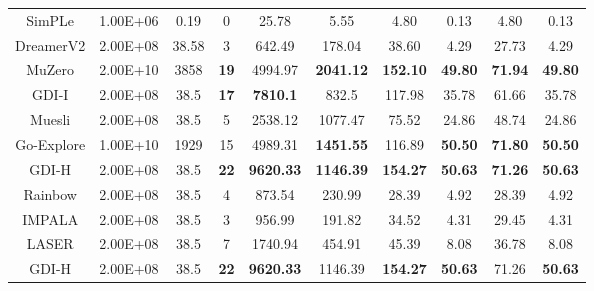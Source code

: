 \documentclass[nohyperref]{article}
\def\GDIHmeanhns{9620.33}
\def\GDIHmedianhns{1146.39}
\def\GDIHHWRB{22}
\def\GDIHmeanHWRNS{154.27}
\def\GDIHmedianHWRNS{50.63}
\def\GDIHmeanSABER{71.26}
\def\GDIHmedianSABER{50.63}
\def\GDIHnumframes{2.00E+08}
\def\GDIHgametime{38.5}
\def\GDIImeanhns{7810.1}
\def\GDIImedianhns{832.5}
\def\GDIIHWRB{17}
\def\GDIImeanHWRNS{117.98}
\def\GDIImedianHWRNS{35.78}
\def\GDIImeanSABER{61.66}
\def\GDIImedianSABER{35.78}
\def\GDIInumframes{2.00E+08}
\def\GDIIgametime{38.5}
\def\rainbowmeanhns{873.54}
\def\rainbowmedianhns{230.99}
\def\rainbowHWRB{4}
\def\rainbowmeanHWRNS{28.39}
\def\rainbowmedianHWRNS{4.92}
\def\rainbowmeanSABER{28.39}
\def\rainbowmedianSABER{4.92}
\def\rainbownumframes{2.00E+08}
\def\rainbowgametime{38.5}
\def\impalameanhns{956.99}
\def\impalamedianhns{191.82}
\def\impalaHWRB{3}
\def\impalameanHWRNS{34.52}
\def\impalamedianHWRNS{4.31}
\def\impalameanSABER{29.45}
\def\impalamedianSABER{4.31}
\def\impalanumframes{2.00E+08}
\def\impalagametime{38.5}
\def\lasermeanhns{1740.94}
\def\lasermedianhns{454.91}
\def\laserHWRB{7}
\def\lasermeanHWRNS{45.39}
\def\lasermedianHWRNS{8.08}
\def\lasermeanSABER{36.78}
\def\lasermedianSABER{8.08}
\def\lasernumframes{2.00E+08}
\def\lasergametime{38.5}
\def\muzeromeanhns{4994.97}
\def\muzeromedianhns{2041.12}
\def\muzeroHWRB{19}
\def\muzeromeanHWRNS{152.10}
\def\muzeromedianHWRNS{49.80}
\def\muzeromeanSABER{71.94}
\def\muzeromedianSABER{49.80}
\def\muzeronumframes{2.00E+10}
\def\muzerogametime{3858}
\def\dreamermeanhns{642.49}
\def\dreamermedianhns{178.04}
\def\dreamerHWRB{3}
\def\dreamermeanHWRNS{38.60}
\def\dreamermedianHWRNS{4.29}
\def\dreamermeanSABER{27.73}
\def\dreamermedianSABER{4.29}
\def\dreamernumframes{2.00E+08}
\def\dreamergametime{38.58 }
\def\simplemeanhns{25.78}
\def\simplemedianhns{5.55}
\def\simpleHWRB{0}
\def\simplemeanHWRNS{4.80}
\def\simplemedianHWRNS{0.13}
\def\simplemeanSABER{4.80}
\def\simplemedianSABER{0.13}
\def\simplenumframes{1.00E+06}
\def\simplegametime{0.19}
\def\mueslimeanhns{2538.12}
\def\mueslimedianhns{1077.47}
\def\muesliHWRB{5}
\def\mueslimeanHWRNS{75.52}
\def\mueslimedianHWRNS{24.86}
\def\mueslimeanSABER{48.74}
\def\mueslimedianSABER{24.86}
\def\mueslinumframes{2.00E+08}
\def\muesligametime{38.5}
\def\goexploremeanhns{4989.31}
\def\goexploremedianhns{1451.55}
\def\goexploreHWRB{15}
\def\goexploremeanHWRNS{116.89}
\def\goexploremedianHWRNS{50.50}
\def\goexploremeanSABER{71.80}
\def\goexploremedianSABER{50.50}
\def\goexplorenumframes{1.00E+10}
\def\goexploregametime{1929}
\theoremstyle{plain}
\begin{document}
\begin{table}[H]
\begin{tabular}{ |c | c | c | c| c c | c c |c c|}
SimPLe      &\simplenumframes   & \simplegametime  & \simpleHWRB  & \simplemeanhns   & \simplemedianhns       &\simplemeanHWRNS   & \simplemedianHWRNS & \simplemeanSABER  & \simplemedianSABER\\
DreamerV2   &\dreamernumframes    & \dreamergametime     & \dreamerHWRB  & \dreamermeanhns  & \dreamermedianhns     &\dreamermeanHWRNS  & \dreamermedianHWRNS & \dreamermeanSABER & \dreamermedianSABER \\
MuZero      & \muzeronumframes   & \muzerogametime     & \textbf{\muzeroHWRB} & \muzeromeanhns & \textbf{\muzeromedianhns}    &\textbf{\muzeromeanHWRNS} & \textbf{\muzeromedianHWRNS}& \textbf{\muzeromeanSABER} & \textbf{\muzeromedianSABER} \\
\hline
\hline
GDI-I       &\GDIInumframes    &\GDIIgametime    & \textbf{\GDIIHWRB} & \textbf{\GDIImeanhns} & \GDIImedianhns     &\GDIImeanHWRNS &\GDIImedianHWRNS & \GDIImeanSABER & \GDIImedianSABER\\
Muesli      &\mueslinumframes    & \muesligametime     & \muesliHWRB           &  \mueslimeanhns         & \mueslimedianhns    & \mueslimeanHWRNS          & \mueslimedianHWRNS  & \mueslimeanSABER & \mueslimedianSABER \\
Go-Explore  & \goexplorenumframes   & \goexploregametime     & \goexploreHWRB & \goexploremeanhns & \textbf{\goexploremedianhns}    &\goexploremeanHWRNS & \textbf{\goexploremedianHWRNS}& \textbf{\goexploremeanSABER} & \textbf{\goexploremedianSABER}\\
\hline
\hline
GDI-H   &\GDIHnumframes    & \GDIHgametime    &\textbf{ \GDIHHWRB} & \textbf{\GDIHmeanhns} & \textbf{\GDIHmedianhns}     &\textbf{\GDIHmeanHWRNS} &\textbf{\GDIHmedianHWRNS} & \textbf{\GDIHmeanSABER} & \textbf{\GDIHmedianSABER}\\
Rainbow     &\rainbownumframes    & \rainbowgametime     & \rainbowHWRB  & \rainbowmeanhns  & \rainbowmedianhns     &\rainbowmeanHWRNS  & \rainbowmedianHWRNS & \rainbowmeanSABER & \rainbowmedianSABER\\
IMPALA      &\impalanumframes    & \impalagametime     & \impalaHWRB  & \impalameanhns  & \impalamedianhns     &\impalameanHWRNS  & \impalamedianHWRNS & \impalameanSABER & \impalamedianSABER\\
LASER       &\lasernumframes    & \lasergametime     & \laserHWRB  & \lasermeanhns & \lasermedianhns     &\lasermeanHWRNS  & \lasermedianHWRNS & \lasermeanSABER & \lasermedianSABER\\
\hline
\hline
GDI-H  &\GDIHnumframes    & \GDIHgametime     & \textbf{\GDIHHWRB} & \textbf{\GDIHmeanhns} & \GDIHmedianhns     &\textbf{\GDIHmeanHWRNS} &\textbf{\GDIHmedianHWRNS} & \GDIHmeanSABER &\textbf{ \GDIHmedianSABER}\\

\end{tabular}
\end{table}
\end{document}

